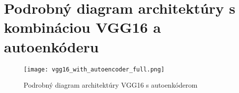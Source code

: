\section{Podrobný diagram architektúry s kombináciou VGG16 a autoenkóderu}
\label{vgg16_autoencoder_architecture_detailed}
\begin{figure}[H]
	\begin{center}
		\texttt{[image: vgg16\_with\_autoencoder\_full.png]}
		\caption[Podrobný diagram architektúry VGG16 s autoenkóderom]{Podrobný diagram architektúry VGG16 s autoenkóderom}
	\end{center}
\end{figure}



